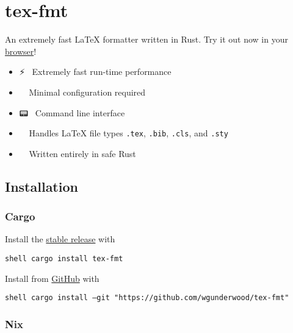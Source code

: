 \documentclass{scrartcl}
\begin{document}
\section{tex-fmt }\hypertarget{tex-fmt-img-srchttpsgithubcomwgunderwoodtex-fmtrawmainextralogosvg-alttex-fmt-alignright-width160-}{}\label{tex-fmt-img-srchttpsgithubcomwgunderwoodtex-fmtrawmainextralogosvg-alttex-fmt-alignright-width160-}

\href{https://github.com/wgunderwood/tex-fmt/actions/workflows/ci.yml}{}
\href{https://crates.io/crates/tex-fmt}{}
\href{https://repology.org/project/tex-fmt/versions}{}
\href{https://mit-license.org/}{}

An extremely fast LaTeX formatter written in Rust.
Try it out now in your
\href{https://wgunderwood.github.io/tex-fmt/}{browser}!

\begin{itemize}
\item{} ⚡~{} Extremely fast run-time performance
\item{} 🔧~{} Minimal configuration required
\item{} 📟~{} Command line interface
\item{} 📜~{} Handles LaTeX file types \texttt{.tex}, \texttt{.bib}, \texttt{.cls}, and \texttt{.sty}
\item{} 🦀~{} Written entirely in safe Rust
\end{itemize}

\subsection{Installation}\hypertarget{installation}{}\label{installation}

\subsubsection{Cargo}\hypertarget{cargo}{}\label{cargo}

Install the \href{https://crates.io/crates/tex-fmt}{stable release} with

\texttt{shell
cargo install tex-fmt
}

Install from \href{https://github.com/WGUNDERWOOD/tex-fmt}{GitHub} with

\texttt{shell
cargo install --git "https://github.com/wgunderwood/tex-fmt"
}

\subsubsection{Nix}\hypertarget{nix}{}\label{nix}
\end{document}
